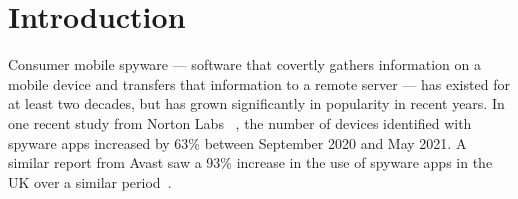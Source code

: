 \documentclass[sigconf,balance=false]{acmart}
\newcommand{\sam}[1]{\textcolor{orange}{\noindent[SH: #1]}}
\newcommand{\sam}[1]{}
\begin{document}
\begin{abstract}
%

\end{abstract}


\maketitle

\section{Introduction}

Consumer mobile spyware --- software that covertly gathers information
on a mobile device and transfers that information to a remote server
--- has existed for at least two decades, but has grown significantly
in popularity in recent years.  In one recent study from Norton Labs
~\cite{AYearAft87:online}, the number of devices identified with
spyware apps increased by 63\% between September 2020 and May 2021. A
similar report from Avast saw a 93\% increase in the use of spyware
apps in the UK over a similar period~\cite{UseofSta91:online}.
\end{document}
